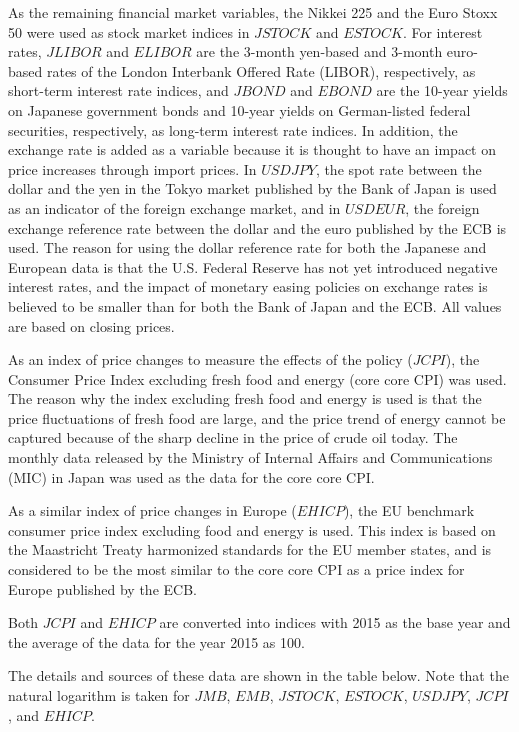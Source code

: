 \documentclass[12pt]{article}
\begin{document}
As the remaining financial market variables, the Nikkei 225 and the Euro Stoxx 50 were used as stock market indices in $JSTOCK$ and $ESTOCK$.
For interest rates, $JLIBOR$ and $ELIBOR$ are the 3-month yen-based and 3-month euro-based rates of the London Interbank Offered Rate (LIBOR), respectively, as short-term interest rate indices, and $JBOND$ and $EBOND$ are the 10-year yields on Japanese government bonds and 10-year yields on German-listed federal securities, respectively, as long-term interest rate indices.
In addition, the exchange rate is added as a variable because it is thought to have an impact on price increases through import prices.
In $USDJPY$, the spot rate between the dollar and the yen in the Tokyo market published by the Bank of Japan is used as an indicator of the foreign exchange market, and in $USDEUR$, the foreign exchange reference rate between the dollar and the euro published by the ECB is used.
The reason for using the dollar reference rate for both the Japanese and European data is that the U.S. Federal Reserve has not yet introduced negative interest rates, and the impact of monetary easing policies on exchange rates is believed to be smaller than for both the Bank of Japan and the ECB.
All values are based on closing prices.

As an index of price changes to measure the effects of the policy ($JCPI$), the Consumer Price Index excluding fresh food and energy (core core CPI) was used.
The reason why the index excluding fresh food and energy is used is that the price fluctuations of fresh food are large, and the price trend of energy cannot be captured because of the sharp decline in the price of crude oil today.
The monthly data released by the Ministry of Internal Affairs and Communications (MIC) in Japan was used as the data for the core core CPI.

As a similar index of price changes in Europe ($EHICP$), the EU benchmark consumer price index excluding food and energy is used.
This index is based on the Maastricht Treaty harmonized standards for the EU member states, and is considered to be the most similar to the core core CPI as a price index for Europe published by the ECB.

Both $JCPI$ and $EHICP$ are converted into indices with 2015 as the base year and the average of the data for the year 2015 as 100.

The details and sources of these data are shown in the table below. Note that the natural logarithm is taken for $JMB$, $EMB$, $JSTOCK$, $ESTOCK$, $USDJPY$, $JCPI$, and $EHICP$.
\end{document}
